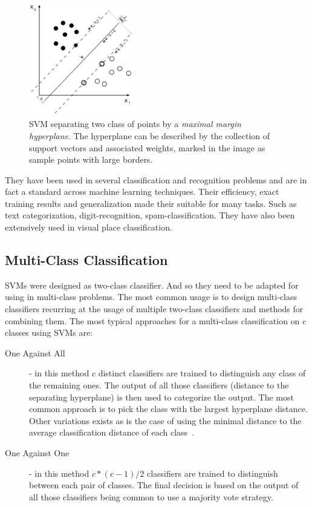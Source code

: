 \begin{figure}[h]
\begin{center}
\includegraphics[width=0.4\textwidth]{figures/Svm_max_sep_hyperplane_with_margin}
\end{center}
\caption{{SVM} separating two class of points by a
         \emph{maximal margin hyperplane}. The hyperplane can be described by
         the collection of support vectors and associated weights, marked in the
         image as sample points with large borders.}
\label{fig:svm-sample}
\end{figure}

They have been used in several classification and recognition problems and are
in fact a standard across machine learning techniques. Their efficiency, exact
training results and generalization made their suitable for many tasks. Such as
text categorization, digit-recognition, spam-classification.
They have also been extensively used in visual place classification.


\subsection{Multi-Class Classification}
\label{sec:multiclass-classifiers}
\Glspl{SVM} were designed as two-class classifier. And so they need to be
adapted for using in multi-class problems. The most common usage is to design
multi-class classifiers recurring at the usage of multiple two-class classifiers
and methods for combining them. The most typical approaches for a multi-class
classification on $c$ classes using \glspl{SVM} are:

\begin{description}
\item[One Against All] - in this method $c$ distinct classifiers are trained to
distinguish any class of the remaining ones. The output of all those classifiers
(distance to the separating hyperplane) is then used to categorize the output.
The most common approach is to pick the class with the largest hyperplane
distance. Other variations exists as is the case of using the minimal distance
to the average classification distance of each class~\citep{pronobis2007confidence}.

\item[One Against One] - in this method $c*(c-1)/2$ classifiers are trained to
distinguish between each pair of classes. The final decision is based on the
output of all those classifiers being common to use a majority vote strategy.
\end{description}

